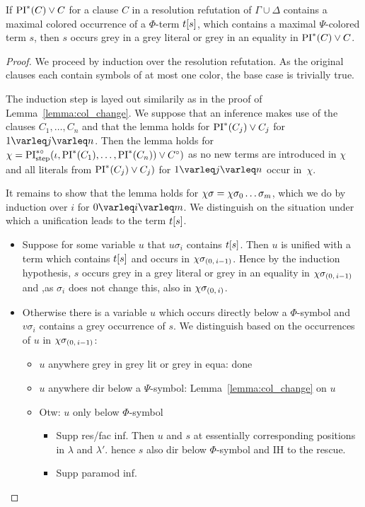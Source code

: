 \documentclass[,%
	draft=false,%
	numbers=noendperiod
	12pt,
	a4paper,
	oneside,%
	openany,
]{memoir}
\newcommand{\inv}{\ensuremath{\chi}}
\begin{document}
\begin{clemma}
	If $\operatorname{PI}^*(C) \lor C$ for a clause $C$ in a resolution refutation of $\Gamma \cup \Delta$ contains a maximal colored occurrence of a $\Phi$-term $t[s]$, which contains a maximal $\Psi$-colored term $s$, then $s$ occurs grey in a grey literal or grey in an equality in $\operatorname{PI}^*(C) \lor C$.
\end{clemma}
\begin{proof}
	We proceed by induction over the resolution refutation.
	As the original clauses each contain symbols of at most one color, the base case is trivially true.

	The induction step is layed out similarily as in the proof of Lemma~\ref{lemma:col_change}. 
	We suppose that an inference makes use of the clauses $C_1, \dots, C_n$ and that the lemma holds for $\operatorname{PI}^*(C_j) \lor C_j$ for $1\varleq j \varleq n$. 
	Then the lemma holds for $\inv = \PIstepstarnosigma(\inference, \PI^*(C_1), \dots, \PI^*(C_n)) \lor C\nosigma)$ as no new terms are introduced in $\inv$ and all literals from $\operatorname{PI}^*(C_j) \lor C_j)$ for $1\varleq j \varleq n$ occur in~$\inv$.

	It remains to show that the lemma holds for $\inv\sigma = \inv \sigma_0 \quantifierdots \sigma_m$, which we do by induction over $i$ for $0 \varleq i \varleq m$.
	We distinguish on the situation under which a unification leads to the term $t[s]$.

	\begin{itemize}
		\item 
			Suppose for some variable $u$ that $u\sigma_i$ contains $t[s]$. 
			Then $u$ is unified with a term which contains $t[s]$ and occurs in $\inv\sigmazmi$.
			Hence by the induction hypothesis, $s$ occurs grey in a grey literal or grey in an equality in $\inv\sigmazmi$ and ,as $\sigma_i$ does not change this, also in $\inv\sigmazi$.

		\item 
			Otherwise there is a variable $u$ which occurs directly below a $\Phi$-symbol and $v\sigma_i$ contains a grey occurrence of $s$.
			We distinguish based on the occurrences of $u$ in $\inv\sigmazmi$:

			\cbstart
			\begin{itemize}
				\item $u$ anywhere grey in grey lit or grey in equa: done
				\item $u$ anywhere dir below a $\Psi$-symbol: Lemma~\ref{lemma:col_change} on $u$ 
				\item Otw: $u$ only below $\Phi$-symbol
					\begin{itemize}
							\item Supp res/fac inf.
								Then $u$ and $s$ at essentially corresponding positions in $\lambda$ and $\lambda'$.
								hence $s$ also dir below $\Phi$-symbol and IH to the rescue.
							\item Supp paramod inf.


\end{itemize}
\end{itemize}
\end{itemize}
\end{proof}
\end{document}
